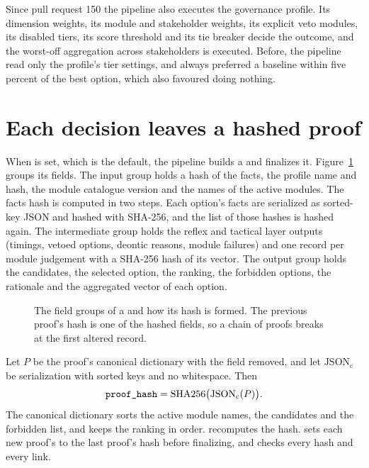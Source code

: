 Since pull request 150 the pipeline also executes the governance profile.
Its dimension weights, its module and stakeholder weights, its explicit veto modules, its disabled
tiers, its score threshold and its tie breaker decide the outcome, and the worst-off aggregation
across stakeholders is executed.
Before, the pipeline read only the profile's tier settings, and always preferred a baseline within five percent of the
best option, which also favoured doing nothing.

\section{Each decision leaves a hashed proof}\label{sec:deme-proof}

When  is set, which is the default, the pipeline builds a
 and finalizes it. Figure~\ref{fig:deme-proof} groups its fields. The input
group holds a hash of the facts, the profile name and hash, the module catalogue version and the
names of the active modules. The facts hash is computed in two steps. Each option's facts are
serialized as sorted-key JSON and hashed with SHA-256, and the list of those hashes is hashed
again. The intermediate group holds the reflex and tactical layer outputs (timings, vetoed
options, deontic reasons, module failures) and one record per module judgement with a SHA-256
hash of its vector. The output group holds the candidates, the selected option, the ranking, the
forbidden options, the rationale and the aggregated vector of each option.

\begin{figure}[t]
\centering

\caption{The field groups of a  and how its hash is formed. The previous
proof's hash is one of the hashed fields, so a chain of proofs breaks at the first altered
record.}
\label{fig:deme-proof}
\end{figure}

Let $P$ be the proof's canonical dictionary with the field  removed, and let
$\mathrm{JSON}_{\mathrm{c}}$ be serialization with sorted keys and no whitespace. Then
\begin{equation}
\texttt{proof\_hash} = \mathrm{SHA256}\bigl(\mathrm{JSON}_{\mathrm{c}}(P)\bigr).
\label{eq:deme-proofhash}
\end{equation}
The canonical dictionary sorts the active module names, the candidates and the forbidden list,
and keeps the ranking in order.  recomputes the hash. 
sets each new proof's  to the last proof's hash before finalizing,
and  checks every hash and every link.


